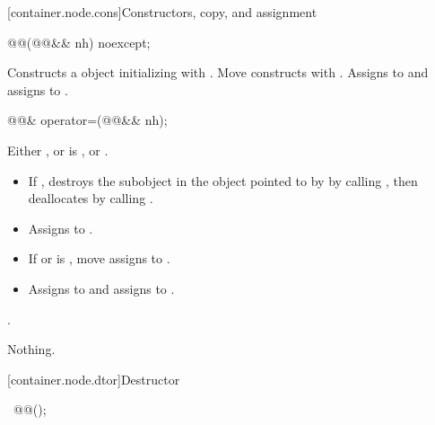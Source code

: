 [container.node.cons]{Constructors, copy, and assignment}

\begin{itemdecl}
@@(@@&& nh) noexcept;
\end{itemdecl}

\begin{itemdescr}
\pnum
\effects
Constructs a  object initializing
 with .  Move constructs  with
.  Assigns  to  and assigns
 to .
\end{itemdescr}

\begin{itemdecl}
@@& operator=(@@&& nh);
\end{itemdecl}

\begin{itemdescr}
\pnum
\expects
Either , or
is , or .

\pnum
\effects
\begin{itemize}
\item
If , destroys the 
subobject in the  object pointed to by 
by calling , then deallocates  by
calling .
\item
Assigns  to .
\item
If  or 
is , \linebreak
move assigns  to .
\item
Assigns
 to  and assigns  to
.
\end{itemize}

\pnum
\returns
{}.

\pnum
\throws
Nothing.
\end{itemdescr}

[container.node.dtor]{Destructor}

\begin{itemdecl}
~@@();
\end{itemdecl}

